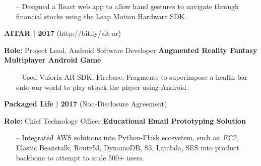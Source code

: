\documentclass{article}
\begin{document}
\begin{multicols}{2}
{{\begin{itemize}
	\item[--] Designed a React web app to allow hand gestures to navigate through financial stocks using the Leap Motion Hardware SDK.
\end{itemize}
}}
\hfill \break
{\footnotesize{\textbf{AITAR | 2017} (http://bit.ly/ait-ar)}}
{\footnotesize{
\newline\textbf{Role:} Project Lead, Android Software Developer
\newline\textbf{Augmented Reality Fantasy Multiplayer Android Game}
\begin{itemize}
	\item[--] Used Vuforia AR SDK, Firebase, Fragments to superimpose a health bar onto our world to play attack the player using Android.
\end{itemize} 
}}
\hfill \break
{\footnotesize{\textbf{Packaged Life | 2017} (Non-Disclosure Agreement)}}
{\footnotesize{
\newline\textbf{Role:} Chief Technology Officer
\newline\textbf{Educational Email Prototyping Solution}
\begin{itemize}
	\item[--] Integrated AWS solutions into Python-Flask ecosystem, such as: EC2, Elastic Beanstalk, Route53, DynamoDB, S3, Lambda, SES into product backbone to attempt to scale 500+ users.
\end{itemize} 
}}

\end{multicols}
\end{document}
